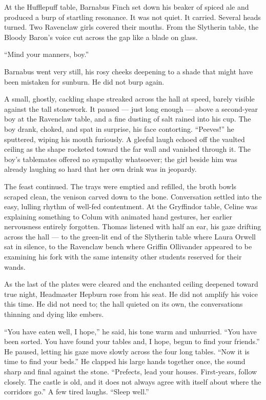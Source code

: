 At the Hufflepuff table, Barnabus Finch set down his beaker of spiced ale and produced a burp of startling resonance. It was not quiet. It carried. Several heads turned. Two Ravenclaw girls covered their mouths. From the Slytherin table, the Bloody Baron's voice cut across the gap like a blade on glass.

\enquote{Mind your manners, boy.}

Barnabus went very still, his rosy cheeks deepening to a shade that might have been mistaken for sunburn. He did not burp again.

A small, ghostly, cackling shape streaked across the hall at speed, barely visible against the tall stonework. It paused --- just long enough --- above a second-year boy at the Ravenclaw table, and a fine dusting of salt rained into his cup. The boy drank, choked, and spat in surprise, his face contorting. \enquote{Peeves!} he sputtered, wiping his mouth furiously. A gleeful laugh echoed off the vaulted ceiling as the shape rocketed toward the far wall and vanished through it. The boy's tablemates offered no sympathy whatsoever; the girl beside him was already laughing so hard that her own drink was in jeopardy.

The feast continued. The trays were emptied and refilled, the broth bowls scraped clean, the venison carved down to the bone. Conversation settled into the easy, lulling rhythm of well-fed contentment. At the Gryffindor table, Celine was explaining something to Colum with animated hand gestures, her earlier nervousness entirely forgotten. Thomas listened with half an ear, his gaze drifting across the hall --- to the green-lit end of the Slytherin table where Laura Orwell sat in silence, to the Ravenclaw bench where Griffin Ollivander appeared to be examining his fork with the same intensity other students reserved for their wands.

As the last of the plates were cleared and the enchanted ceiling deepened toward true night, Headmaster Hepburn rose from his seat. He did not amplify his voice this time. He did not need to; the hall quieted on its own, the conversations thinning and dying like embers.

\enquote{You have eaten well, I hope,} he said, his tone warm and unhurried. \enquote{You have been sorted. You have found your tables and, I hope, begun to find your friends.} He paused, letting his gaze move slowly across the four long tables. \enquote{Now it is time to find your beds.} He clapped his large hands together once, the sound sharp and final against the stone. \enquote{Prefects, lead your houses. First-years, follow closely. The castle is old, and it does not always agree with itself about where the corridors go.} A few tired laughs. \enquote{Sleep well.}

